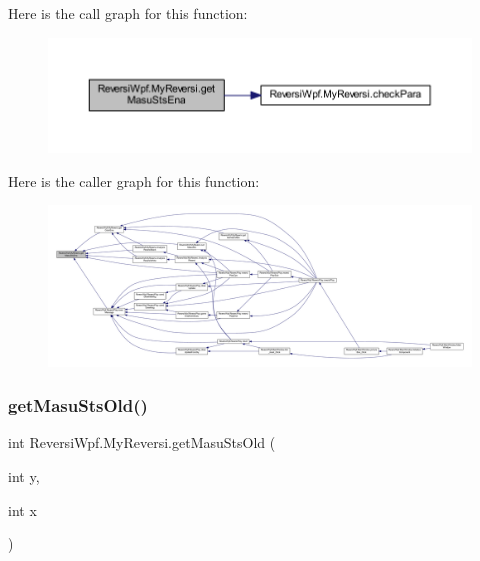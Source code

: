 Here is the call graph for this function\+:\nopagebreak
\begin{figure}[H]
\begin{center}
\leavevmode
\includegraphics[width=350pt]{class_reversi_wpf_1_1_my_reversi_ac122d3db633616259d22d8bb885c074d_cgraph}
\end{center}
\end{figure}
Here is the caller graph for this function\+:
\nopagebreak
\begin{figure}[H]
\begin{center}
\leavevmode
\includegraphics[width=350pt]{class_reversi_wpf_1_1_my_reversi_ac122d3db633616259d22d8bb885c074d_icgraph}
\end{center}
\end{figure}
\mbox{\label{class_reversi_wpf_1_1_my_reversi_acdf94f106c88ded99a4c5dcbbc19be16}} 
\subsubsection{\texorpdfstring{get\+Masu\+Sts\+Old()}{getMasuStsOld()}}
{\footnotesize\ttfamily int Reversi\+Wpf.\+My\+Reversi.\+get\+Masu\+Sts\+Old (\begin{DoxyParamCaption}\item[{int}]{y,  }\item[{int}]{x }\end{DoxyParamCaption})}



